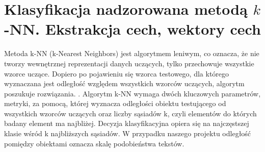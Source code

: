 \documentclass{article}
\begin{document}
\section{Klasyfikacja nadzorowana metodą $k$-NN.  Ekstrakcja cech, wektory cech}
Metoda k-NN (k-Nearest Neighbors) jest algorytmem leniwym, co oznacza, że nie tworzy wewnętrznej reprezentacji danych uczących, tylko przechowuje wszystkie wzorce uczące. Dopiero po pojawieniu się wzorca testowego, dla którego wyznaczana jest odległość względem wszystkich wzorców uczących, algorytm poszukuje rozwiązania. \cite{knn}. Algorytm k-NN wymaga dwóch kluczowych parametrów, metryki, za pomocą, której wyznacza odległości obiektu testującego od wszystkich wzorców uczących oraz liczby sąsiadów k, czyli elementów do których badany element ma najbliżej. Decyzja klasyfikacyjna opiera się na najczęstszej klasie wśród k najbliższych sąsiadów. W przypadku naszego projektu odległość pomiędzy obiektami oznacza skalę podobieństwa tekstów.
\end{document}
